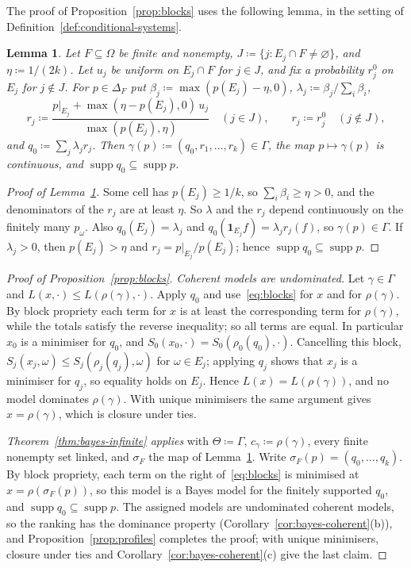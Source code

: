 \documentclass[11pt]{article}
\newtheorem{lemma}[theorem]{Lemma}
\theoremstyle{definition}
\theoremstyle{remark}
\newcommand{\one}{\mathbf 1}
\newcommand{\supp}{\operatorname{supp}}
\begin{document}
The proof of Proposition~\ref{prop:blocks} uses the following lemma, in the setting of Definition~\ref{def:conditional-systems}.
\begin{lemma}\label{lem:section}
Let $F\subseteq\Omega$ be finite and nonempty, $J\coloneqq\{j:E_j\cap F\ne\varnothing\}$, and $\eta\coloneqq1/(2k)$. Let $u_j$ be uniform on $E_j\cap F$ for $j\in J$, and fix a probability $r_j^0$ on $E_j$ for $j\notin J$. For $p\in\Delta_F$ put $\beta_j\coloneqq\max(p(E_j)-\eta,0)$, $\lambda_j\coloneqq\beta_j/\sum_i\beta_i$,
\[
r_j\coloneqq\frac{p|_{E_j}+\max(\eta-p(E_j),0)\,u_j}{\max(p(E_j),\eta)}\quad(j\in J),\qquad r_j\coloneqq r_j^0\quad(j\notin J),
\]
and $q_0\coloneqq\sum_j\lambda_jr_j$. Then $\gamma(p)\coloneqq(q_0,r_1,\dots,r_k)\in\Gamma$, the map $p\mapsto\gamma(p)$ is continuous, and $\supp q_0\subseteq\supp p$.
\end{lemma}
\begin{proof}[Proof of Lemma~\ref{lem:section}]
Some cell has $p(E_j)\ge1/k$, so $\sum_i\beta_i\ge\eta>0$, and the denominators of the $r_j$ are at least $\eta$. So $\lambda$ and the $r_j$ depend continuously on the finitely many $p_\omega$. Also $q_0(E_j)=\lambda_j$ and $q_0(\one_{E_j}f)=\lambda_jr_j(f)$, so $\gamma(p)\in\Gamma$. If $\lambda_j>0$, then $p(E_j)>\eta$ and $r_j=p|_{E_j}/p(E_j)$; hence $\supp q_0\subseteq\supp p$.
\end{proof}

\begin{proof}[Proof of Proposition~\ref{prop:blocks}]
\emph{Coherent models are undominated.} Let $\gamma\in\Gamma$ and $L(x,\cdot)\le L(\rho(\gamma),\cdot)$. Apply $q_0$ and use~\eqref{eq:blocks} for $x$ and for $\rho(\gamma)$. By block propriety each term for $x$ is at least the corresponding term for $\rho(\gamma)$, while the totals satisfy the reverse inequality; so all terms are equal. In particular $x_0$ is a minimiser for $q_0$, and $S_0(x_0,\cdot)=S_0(\rho_0(q_0),\cdot)$. Cancelling this block, $S_j(x_j,\omega)\le S_j(\rho_j(q_j),\omega)$ for $\omega\in E_j$; applying $q_j$ shows that $x_j$ is a minimiser for $q_j$, so equality holds on $E_j$. Hence $L(x)=L(\rho(\gamma))$, and no model dominates $\rho(\gamma)$. With unique minimisers the same argument gives $x=\rho(\gamma)$, which is closure under ties.

\emph{Theorem~\ref{thm:bayes-infinite} applies} with $\Theta\coloneqq\Gamma$, $c_\gamma\coloneqq\rho(\gamma)$, every finite nonempty set linked, and $\sigma_F$ the map of Lemma~\ref{lem:section}. Write $\sigma_F(p)=(q_0,\dots,q_k)$. By block propriety, each term on the right of~\eqref{eq:blocks} is minimised at $x=\rho(\sigma_F(p))$, so this model is a Bayes model for the finitely supported $q_0$, and $\supp q_0\subseteq\supp p$. The assigned models are undominated coherent models, so the ranking has the dominance property (Corollary~\ref{cor:bayes-coherent}(b)), and Proposition~\ref{prop:profiles} completes the proof; with unique minimisers, closure under ties and Corollary~\ref{cor:bayes-coherent}(c) give the last claim.
\end{proof}
\end{document}
